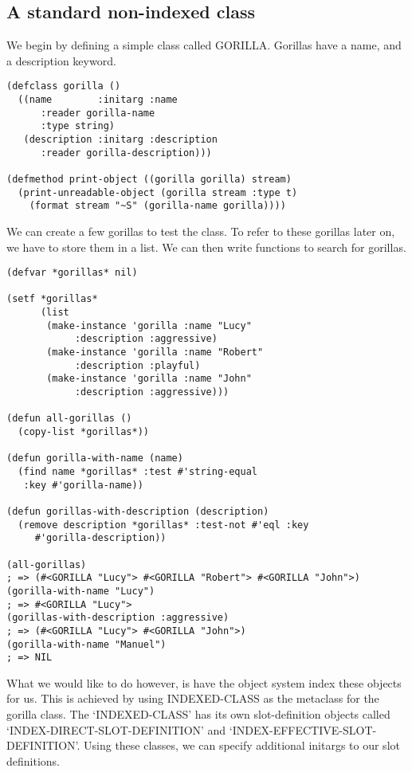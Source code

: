 \subsection{ A standard non-indexed class}

We begin by defining a simple class called GORILLA. Gorillas have
a name, and a description keyword.

\begin{Verbatim}[fontsize=\small,frame=leftline,framerule=0.9mm,rulecolor=\color{gray},framesep=5.1mm,xleftmargin=5mm,fontfamily=cmtt]
(defclass gorilla ()
  ((name        :initarg :name
      :reader gorilla-name
      :type string)
   (description :initarg :description
      :reader gorilla-description)))

(defmethod print-object ((gorilla gorilla) stream)
  (print-unreadable-object (gorilla stream :type t)
    (format stream "~S" (gorilla-name gorilla))))
\end{Verbatim}
We can create a few gorillas to test the class. To refer to these
gorillas later on, we have to store them in a list. We can then
write functions to search for gorillas.

\begin{Verbatim}[fontsize=\small,frame=leftline,framerule=0.9mm,rulecolor=\color{gray},framesep=5.1mm,xleftmargin=5mm,fontfamily=cmtt]
(defvar *gorillas* nil)

(setf *gorillas*
      (list
       (make-instance 'gorilla :name "Lucy"
            :description :aggressive)
       (make-instance 'gorilla :name "Robert"
            :description :playful)
       (make-instance 'gorilla :name "John"
            :description :aggressive)))

(defun all-gorillas ()
  (copy-list *gorillas*))

(defun gorilla-with-name (name)
  (find name *gorillas* :test #'string-equal
   :key #'gorilla-name))

(defun gorillas-with-description (description)
  (remove description *gorillas* :test-not #'eql :key
     #'gorilla-description))

(all-gorillas)
; => (#<GORILLA "Lucy"> #<GORILLA "Robert"> #<GORILLA "John">)
(gorilla-with-name "Lucy")
; => #<GORILLA "Lucy">
(gorillas-with-description :aggressive)
; => (#<GORILLA "Lucy"> #<GORILLA "John">)
(gorilla-with-name "Manuel")
; => NIL
\end{Verbatim}
What we would like to do however, is have the object system index
these objects for us. This is achieved by using INDEXED-CLASS as
the metaclass for the gorilla class. The `INDEXED-CLASS' has its
own slot-definition objects called `INDEX-DIRECT-SLOT-DEFINITION'
and `INDEX-EFFECTIVE-SLOT-DEFINITION'. Using these classes, we can
specify additional initargs to our slot definitions.



